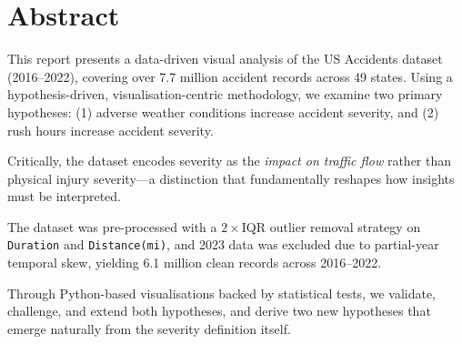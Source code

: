 
\section*{Abstract}

This report presents a data-driven visual analysis of the US Accidents dataset
(2016--2022), covering over 7.7 million accident records across 49 states.
Using a hypothesis-driven, visualisation-centric methodology, we examine two
primary hypotheses: (1) adverse weather conditions increase accident severity,
and (2) rush hours increase accident severity.

Critically, the dataset encodes severity as the \emph{impact on traffic flow}
rather than physical injury severity—a distinction that fundamentally reshapes
how insights must be interpreted.

The dataset was pre-processed with a $2\times$IQR outlier removal strategy on
\texttt{Duration} and \texttt{Distance(mi)}, and 2023 data was excluded
due to partial-year temporal skew, yielding 6.1 million clean records across
2016--2022.

Through Python-based visualisations backed by statistical tests, we validate,
challenge, and extend both hypotheses, and derive two new hypotheses that emerge
naturally from the severity definition itself.

